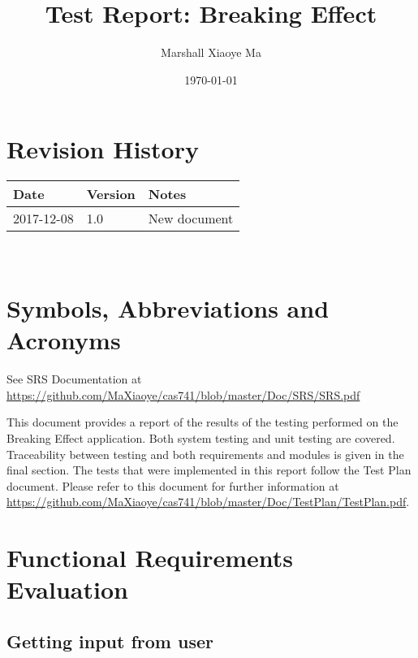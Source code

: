 \documentclass[12pt, titlepage]{article}
\begin{document}
\title{Test Report: Breaking Effect} 
\author{Marshall Xiaoye Ma}
\date{\today}
	
\maketitle


\section{Revision History}

\begin{tabularx}{\textwidth}{p{3cm}p{2cm}X}
\toprule {\bf Date} & {\bf Version} & {\bf Notes}\\
\midrule
2017-12-08 & 1.0 & New document\\
\bottomrule
\end{tabularx}

~\newpage

\section{Symbols, Abbreviations and Acronyms}

See SRS Documentation at \url{https://github.com/MaXiaoye/cas741/blob/master/Doc/SRS/SRS.pdf}

\newpage

\tableofcontents

\listoftables %

\listoffigures %

\newpage


This document provides a report of the results of the testing performed on the Breaking Effect application. Both system testing and unit testing are covered. Traceability between testing and both requirements and modules is given in the final section.
The tests that were implemented in this report follow the Test Plan document. Please refer to this document for further information at \url{https://github.com/MaXiaoye/cas741/blob/master/Doc/TestPlan/TestPlan.pdf}.

\section{Functional Requirements Evaluation}

\subsection{Getting input from user}
\label{Sec_TestInput}
\end{document}
